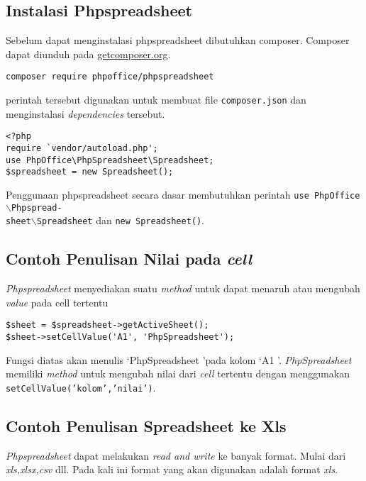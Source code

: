 \subsection{Instalasi Phpspreadsheet}
Sebelum dapat menginstalasi phpspreadsheet dibutuhkan composer. Composer dapat diunduh pada \url{getcomposer.org}. 


\begin{lstlisting}
composer require phpoffice/phpspreadsheet
\end{lstlisting}

perintah tersebut digunakan untuk membuat file \texttt{composer.json} dan menginstalasi \textit{dependencies} tersebut. 


\begin{lstlisting}
<?php
require `vendor/autoload.php';
use PhpOffice\PhpSpreadsheet\Spreadsheet;
$spreadsheet = new Spreadsheet();
\end{lstlisting}


Penggunaan phpspreadsheet secara dasar membutuhkan perintah \texttt{use PhpOffice$\backslash$Phpspread-\\sheet$\backslash$Spreadsheet} dan \texttt{new Spreadsheet()}.

\subsection{Contoh Penulisan Nilai pada \textit{cell}}

\textit{Phpspreadsheet} menyediakan suatu \textit{method} untuk dapat menaruh atau mengubah \textit{value} pada cell tertentu

\begin{lstlisting}
$sheet = $spreadsheet->getActiveSheet();
$sheet->setCellValue('A1', 'PhpSpreadsheet');
\end{lstlisting}

 Fungsi diatas akan menulis \lq PhpSpreadsheet \rq pada kolom \lq A1 \rq . \textit{PhpSpreadsheet} memiliki \textit{method} untuk mengubah nilai dari \textit{cell} tertentu dengan menggunakan \texttt{setCellValue('kolom','nilai')}.


\subsection{Contoh Penulisan Spreadsheet ke Xls }

\textit{Phpspreadsheet} dapat melakukan \textit{read and write} ke banyak format. Mulai dari \textit{xls,xlsx,csv} dll. Pada kali ini format yang akan digunakan adalah format  \textit{xls}.

